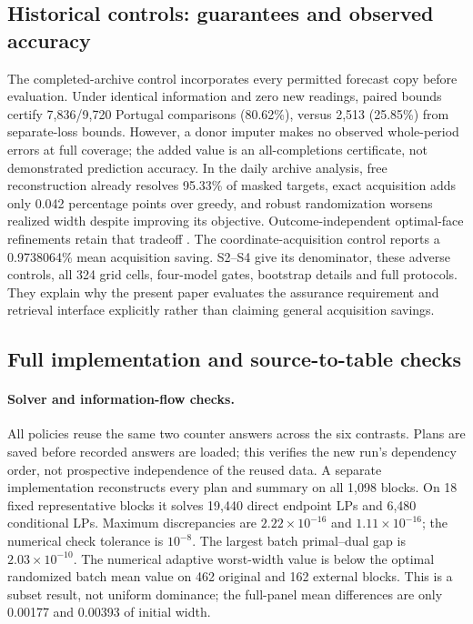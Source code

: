 \subsection{Historical controls: guarantees and observed accuracy}
\label{sec:historical-application:s15}
The completed-archive control \citep{portugal,uci} incorporates every permitted forecast
copy before evaluation. Under identical information and zero new readings,
paired bounds certify 7,836/9,720 Portugal comparisons (80.62\%), versus
2,513 (25.85\%) from separate-loss bounds. However, a donor imputer makes
no observed whole-period errors at full coverage; the added value is an
all-completions certificate, not demonstrated prediction accuracy.
In the daily archive analysis, free reconstruction already resolves 95.33\%
of masked targets, exact acquisition adds only 0.042 percentage points over
greedy, and robust randomization worsens realized width despite improving
its objective. Outcome-independent optimal-face refinements retain that
tradeoff \citep{iancu2014}. The coordinate-acquisition control reports a
0.9738064\% mean acquisition saving. S2--S4 give its denominator, these adverse controls,
all 324 grid cells, four-model gates, bootstrap details and full protocols.
They explain why the present paper evaluates the assurance requirement and
retrieval interface explicitly rather than claiming general acquisition savings.
\subsection{Full implementation and source-to-table checks}
\paragraph{Solver and information-flow checks.}
All policies reuse the same two counter answers across the six contrasts.
Plans are saved before recorded answers are loaded; this verifies the new
run's dependency order, not prospective independence of the reused data.
A separate implementation reconstructs every plan and summary on all 1,098
blocks. On 18 fixed representative blocks it solves 19,440 direct endpoint
LPs and 6,480 conditional LPs. Maximum discrepancies are
$2.22\times10^{-16}$ and $1.11\times10^{-16}$; the numerical check tolerance
is $10^{-8}$. The largest batch primal--dual gap is $2.03\times10^{-10}$.
The numerical adaptive worst-width value is below the optimal randomized
batch mean value on 462 original and 162 external blocks. This is a
subset result, not uniform dominance; the full-panel mean differences are
only 0.00177 and 0.00393 of initial width.

